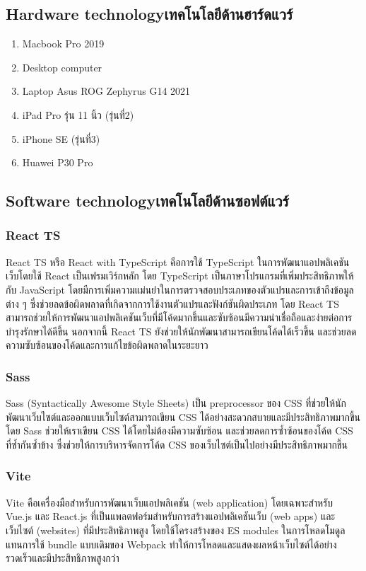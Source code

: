 \subsection{\ifenglish Hardware technology\else เทคโนโลยีด้านฮาร์ดแวร์\fi}
\begin{enumerate}
    \item Macbook Pro 2019
    \item Desktop computer
    \item Laptop Asus ROG Zephyrus G14 2021
    \item iPad Pro รุ่น 11 นิ้ว (รุ่นที่2)
    \item iPhone SE (รุ่นที่3)
    \item Huawei P30 Pro
\end{enumerate}

\subsection{\ifenglish Software technology\else เทคโนโลยีด้านซอฟต์แวร์\fi}
\subsubsection{React TS~\cite{react_ts}}
React TS หรือ React with TypeScript คือการใช้ TypeScript ในการพัฒนาแอปพลิเคชันเว็บโดยใช้ React เป็นเฟรมเวิร์กหลัก โดย TypeScript เป็นภาษาโปรแกรมที่เพิ่มประสิทธิภาพให้กับ JavaScript โดยมีการเพิ่มความแม่นยำในการตรวจสอบประเภทของตัวแปรและการเข้าถึงข้อมูลต่าง ๆ ซึ่งช่วยลดข้อผิดพลาดที่เกิดจากการใช้งานตัวแปรและฟังก์ชันผิดประเภท โดย React TS สามารถช่วยให้การพัฒนาแอปพลิเคชันเว็บที่มีโค้ดมากขึ้นและซับซ้อนมีความน่าเชื่อถือและง่ายต่อการบำรุงรักษาได้ดีขึ้น นอกจากนี้ React TS ยังช่วยให้นักพัฒนาสามารถเขียนโค้ดได้เร็วขึ้น และช่วยลดความซับซ้อนของโค้ดและการแก้ไขข้อผิดพลาดในระยะยาว
\subsubsection{Sass~\cite{sass}}
Sass (Syntactically Awesome Style Sheets) เป็น preprocessor ของ CSS ที่ช่วยให้นักพัฒนาเว็บไซต์และออกแบบเว็บไซต์สามารถเขียน CSS ได้อย่างสะดวกสบายและมีประสิทธิภาพมากขึ้น โดย Sass ช่วยให้เราเขียน CSS ได้โดยไม่ต้องมีความซับซ้อน และช่วยลดการซ้ำซ้อนของโค้ด CSS ที่ซ้ำกันซ้ำข้าง ซึ่งช่วยให้การบริหารจัดการโค้ด CSS ของเว็บไซต์เป็นไปอย่างมีประสิทธิภาพมากขึ้น
\subsubsection{Vite~\cite{vite}}
Vite คือเครื่องมือสำหรับการพัฒนาเว็บแอปพลิเคชัน (web application) โดยเฉพาะสำหรับ Vue.js และ React.js ที่เป็นแพลตฟอร์มสำหรับการสร้างแอปพลิเคชันเว็บ (web apps) และเว็บไซต์ (websites) ที่มีประสิทธิภาพสูง โดยใช้โครงสร้างของ ES modules ในการโหลดโมดูลแทนการใช้ bundle แบบเดิมของ Webpack ทำให้การโหลดและแสดงผลหน้าเว็บไซต์ได้อย่างรวดเร็วและมีประสิทธิภาพสูงกว่า

